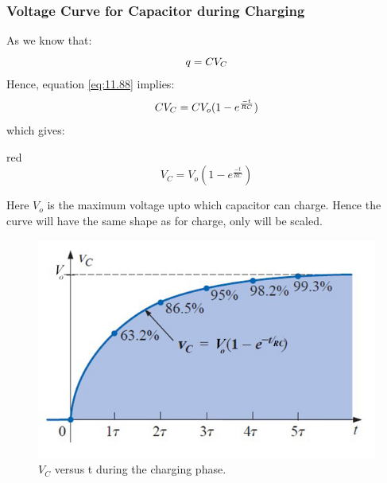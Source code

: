 \subsubsection{Voltage Curve for Capacitor during Charging}
As we know that:
\begin{equation}\notag
  q = CV_{C}
\end{equation}
Hence, equation \ref{eq:11.88} implies:
\begin{equation}\notag
  CV_{C}= CV_{o}(1-e^{\frac{-t}{RC}})
\end{equation}
which gives:
\begin{mybox}{red}{}
  \begin{equation}\label{eq:11.89}
    V_{C} = V_{o}(1-e^{\frac{-t}{RC}})
  \end{equation}
\end{mybox}
\noindent Here $V_{o}$ is the maximum voltage upto which capacitor
can charge. Hence the curve will have the same shape as for charge,
only will be scaled.
\begin{figure}[H]
  \centering
  \includegraphics[scale = 0.4]{Images/Chapter-11/11.38}
  \caption{$V_{C}$ versus t during the charging phase.}
  \label{fig:11.38}
\end{figure}
